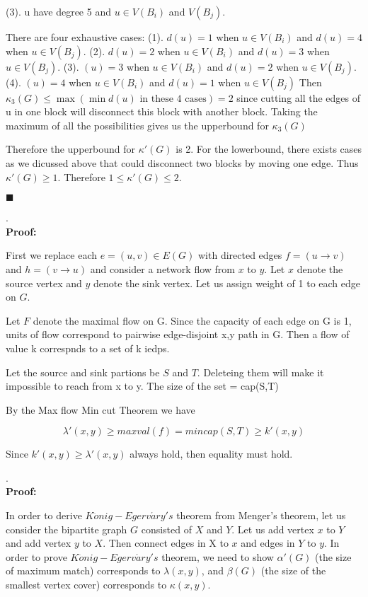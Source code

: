 \documentclass[12pt]{article}
\begin{document}
	(3). u have degree 5 and $u \in V(B_i)$ and $V(B_j)$.
	
	There are four exhaustive cases: (1). $d(u) = 1$ when $u \in V(B_i)$ and $d(u) = 4$ when $u \in V(B_j)$. (2). $d(u) = 2$ when $u \in V(B_i)$ and $d(u) = 3$ when $u \in V(B_j)$. (3). $(u) = 3$ when $u \in V(B_i)$ and $d(u) = 2$ when $u \in V(B_j)$. (4). $(u) = 4$ when $u \in V(B_i)$ and $d(u) = 1$ when $u \in V(B_j)$ Then $\kappa_3(G) \leq \max (\min d(u) \text{ in these 4 cases}) = 2$ since cutting all the edges of u in one block will disconnect this block with another block. Taking the maximum of all the possibilities gives us the upperbound for $\kappa_3(G)$
	
	Therefore the upperbound for $\kappa'(G)$ is 2. For the lowerbound, there exists cases as we dicussed above that could disconnect two blocks by moving one edge. Thus $\kappa'(G) \geq 1$. Therefore $1 \leq \kappa'(G) \leq 2$.
	
	
	\hfill $\blacksquare$ 
	
	.\\
	\textbf{Proof:}
	
	First we replace each $e = (u,v) \in E(G)$ with directed edges $f = (u \rightarrow v)$ and $h = (v \rightarrow u)$ and consider a network flow from $x$ to $y$. Let $x$ denote the source vertex and $y$ denote the sink vertex. Let us assign weight of 1 to each edge on $G$.
	
	Let $F$ denote the maximal flow on G. Since the capacity of each edge on G is 1, units of flow correspond to pairwise edge-disjoint x,y path in G. Then a flow of value k correspnds to a set of k iedps.
	
	Let the source and sink partions be $S$ and $T$. Deleteing them will make it impossible to reach from x to y. The size of the set = cap(S,T)
	
	By the Max flow Min cut Theorem we have
	
	$$\lambda'(x,y) \geq max val(f) = min cap(S,T) \geq k'(x,y)$$
	
	Since $k'(x,y) \geq \lambda' (x,y)$ always hold, then equality must hold.
	
	\newpage
	
	.\\
	\textbf{Proof:}
	
	In order to derive $K\ddot{o}nig-Egerv\acute{a}ry's$ theorem from Menger's theorem, let us consider the bipartite graph $G$ consisted of $X$ and $Y$. Let us add vertex $x$ to $Y$ and add vertex $y$ to $X$. Then connect edges in X to $x$ and edges in $Y$ to $y$. In order to prove $K\ddot{o}nig-Egerv\acute{a}ry's$ theorem, we need to show $\alpha'(G)$ (the size of maximum match) corresponds to $\lambda (x,y)$, and $\beta(G)$ (the size of the smallest vertex cover) corresponds to $ \kappa (x,y)$.
	
\end{document}

